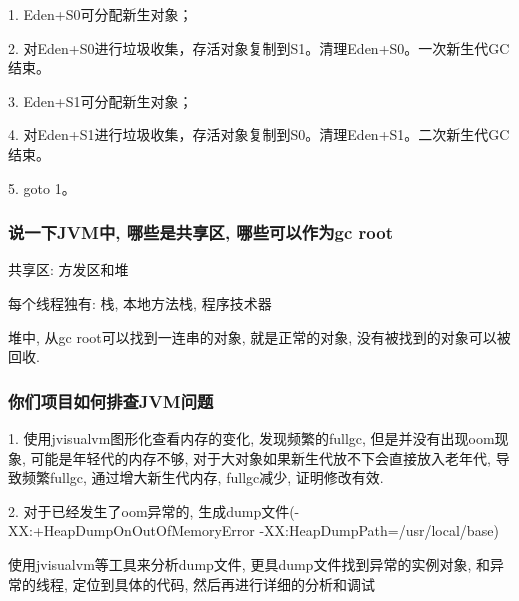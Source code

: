 \documentclass[UTF8]{ctexart}
\begin{document}
1. Eden+S0可分配新生对象；

2. 对Eden+S0进行垃圾收集，存活对象复制到S1。清理Eden+S0。一次新生代GC结束。

3. Eden+S1可分配新生对象；

4. 对Eden+S1进行垃圾收集，存活对象复制到S0。清理Eden+S1。二次新生代GC结束。

5. goto 1。
\subsubsection{说一下JVM中, 哪些是共享区, 哪些可以作为gc root}
共享区: 方发区和堆 \par
每个线程独有: 栈, 本地方法栈, 程序技术器 \par
堆中, 从gc root可以找到一连串的对象, 就是正常的对象, 没有被找到的对象可以被回收.
\subsubsection{你们项目如何排查JVM问题}
1. 使用jvisualvm图形化查看内存的变化, 发现频繁的fullgc, 但是并没有出现oom现象, 可能是年轻代的内存不够, 对于大对象如果新生代放不下会直接放入老年代, 导致频繁fullgc, 通过增大新生代内存, fullgc减少, 证明修改有效. \par
2. 对于已经发生了oom异常的, 生成dump文件(-XX:+HeapDumpOnOutOfMemoryError -XX:HeapDumpPath=/usr/local/base) \par
使用jvisualvm等工具来分析dump文件, 更具dump文件找到异常的实例对象, 和异常的线程, 定位到具体的代码, 然后再进行详细的分析和调试 \par
\end{document}
